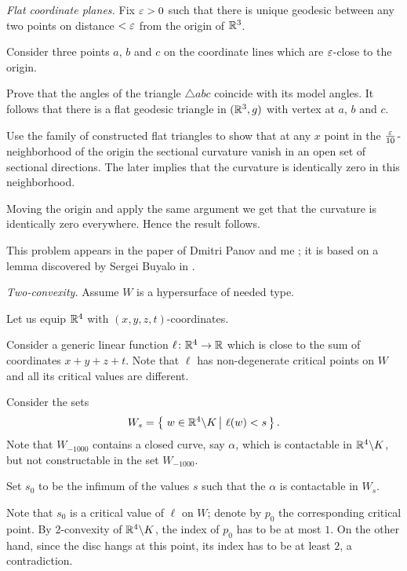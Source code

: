 \textit{Flat coordinate planes.}
Fix $\varepsilon>0$ such that there is unique geodesic between any two points on distance $<\varepsilon$ from the origin of $\mathbb{R}^3$.

Consider three points $a$, $b$ and $c$ 
on the coordinate lines which are $\varepsilon$-close 
to the origin.

Prove that the angles of the triangle $\triangle abc$
coincide with its model angles.
It follows that there is a flat geodesic triangle in $(\mathbb{R}^3,g)$ with vertex at $a$, $b$ and $c$.

Use the family of constructed flat triangles 
to show that at any $x$ point in the $\tfrac{\varepsilon}{10}$-neighborhood of the origin
the sectional curvature 
vanish in an open set of sectional directions.
The later implies that the curvature is identically zero 
in this neighborhood.

Moving the origin and apply the same argument we get that the curvature is identically zero everywhere.
Hence the result follows. 

This problem appears in the paper of Dmitri Panov and me \cite{panov-petrunin}; 
it is based on a lemma discovered by Sergei Buyalo in \cite{buyalo}.

\textit{Two-convexity.}
Assume $W$ is a hypersurface of needed type.

Let us equip $\mathbb{R}^4$ with $(x,y,z,t)$-coordinates.

Consider a generic linear function $\ell\colon\mathbb{R}^4\to\mathbb{R}$
which is close to the sum of coordinates $x+y+z+t$.
Note that $\ell$
has non-degenerate critical points on $W$ and all its critical values are different.

Consider the sets 
$$W_s=\set{w\in \RR^4\backslash K}{\ell(w)<s}.$$
Note that $W_{-1000}$ contains a closed curve, say $\alpha$, 
which is contactable in $\mathbb{R}^4\backslash K$, 
but not constructable in the set $W_{-1000}$.

Set $s_0$ to be the infimum of the values $s$ such that
the $\alpha$ is contactable in $W_s$.

Note that $s_0$ is a critical value of $\ell$ on $W$;
denote by $p_0$ the corresponding critical point.
By 2-convexity of $\mathbb{R}^4\backslash K$,
the index of $p_0$ has to be at most $1$.
On the other hand, since the disc hangs at this point,
its index has to be at least $2$,
 a contradiction.

